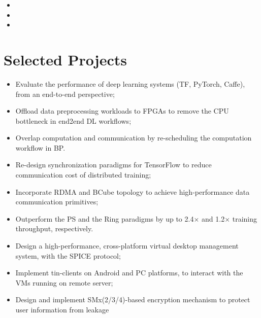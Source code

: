 \documentclass{resume}
\begin{document}
\begin{itemize}
	\item {}
	\item {}	
	\item {}
\end{itemize}


\section{Selected Projects}
\begin{itemize}
	\item Evaluate the performance of deep learning systems (TF, PyTorch, Caffe), from an end-to-end perspective;
	\item Offload data preprocessing workloads to FPGAs to remove the CPU bottleneck in end2end DL workflows;
	\item Overlap computation and communication by re-scheduling the computation workflow in BP.
\end{itemize}

\begin{itemize}
	\item Re-design synchronization paradigms for TensorFlow to reduce communication cost of distributed training;
	\item Incorporate RDMA and BCube topology to achieve high-performance data communication primitives;
	\item Outperform the PS and the Ring paradigms by up to 2.4$\times$ and 1.2$\times$ training throughput, respectively.
\end{itemize}

\begin{itemize}
	\item Design a high-performance, cross-platform virtual desktop management system, with the SPICE protocol;
	\item Implement tin-clients on Android and PC platforms,  to interact with the VMs running on remote server;
	\item Design and implement SMx(2/3/4)-based encryption mechanism to protect user information from leakage
\end{itemize}
\end{document}
